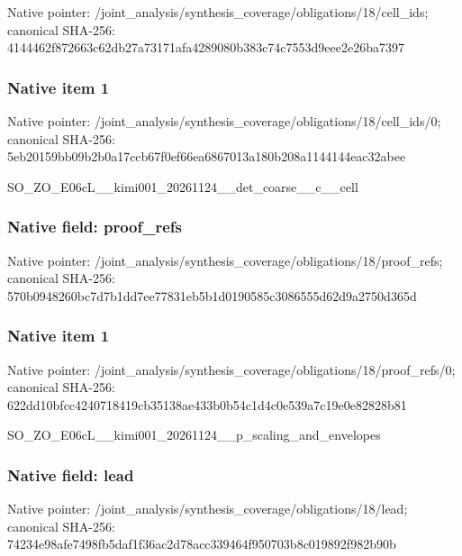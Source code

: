 \documentclass[10pt,a4paper]{article}
\begin{document}
Native pointer: /joint\_analysis/synthesi\allowbreak{}s\_coverage/obligations/1\allowbreak{}8/cell\_ids; canonical SHA-256: 4144462f872663c62db27a73\allowbreak{}171afa4289080b383c74c755\allowbreak{}3d9eee2e26ba7397



\subsubsection{Native item 1}


Native pointer: /joint\_analysis/synthesi\allowbreak{}s\_coverage/obligations/1\allowbreak{}8/cell\_ids/0; canonical SHA-256: 5eb20159bb09b2b0a17ccb67\allowbreak{}f0ef66ea6867013a180b208a\allowbreak{}1144144eac32abee


SO\_ZO\_E06cL\_\_kimi001\_202\allowbreak{}61124\_\_det\_coarse\_\_c\_\_ce\allowbreak{}ll


\subsubsection{Native field: proof\_refs}


Native pointer: /joint\_analysis/synthesi\allowbreak{}s\_coverage/obligations/1\allowbreak{}8/proof\_refs; canonical SHA-256: 570b0948260bc7d7b1dd7ee7\allowbreak{}7831eb5b1d0190585c308655\allowbreak{}5d62d9a2750d365d



\subsubsection{Native item 1}


Native pointer: /joint\_analysis/synthesi\allowbreak{}s\_coverage/obligations/1\allowbreak{}8/proof\_refs/0; canonical SHA-256: 622dd10bfcc4240718419cb3\allowbreak{}5138ae433b0b54c1d4c0e539\allowbreak{}a7c19e0e82828b81


SO\_ZO\_E06cL\_\_kimi001\_202\allowbreak{}61124\_\_p\_scaling\_and\_env\allowbreak{}elopes


\subsubsection{Native field: lead}


Native pointer: /joint\_analysis/synthesi\allowbreak{}s\_coverage/obligations/1\allowbreak{}8/lead; canonical SHA-256: 74234e98afe7498fb5daf1f3\allowbreak{}6ac2d78acc339464f950703b\allowbreak{}8c019892f982b90b
\end{document}

